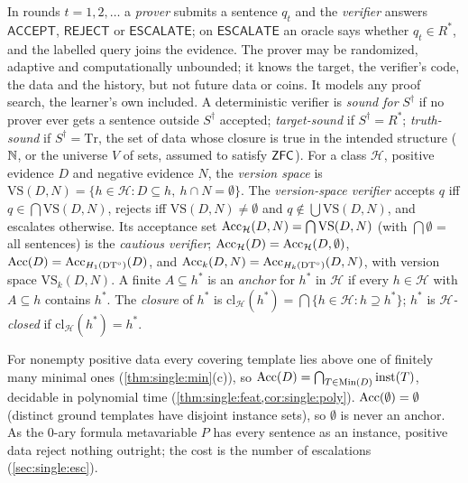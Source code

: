 \begin{definition}\label{def:setting:protocol}
In rounds $t=1,2,\dots$ a \emph{prover} submits a sentence $q_t$ and the \emph{verifier} answers $\mathsf{ACCEPT}$, $\mathsf{REJECT}$ or $\mathsf{ESCALATE}$; on $\mathsf{ESCALATE}$ an oracle says whether $q_t\in R^*$, and the labelled query joins the evidence. The prover may be randomized, adaptive and computationally unbounded; it knows the target, the verifier's code, the data and the history, but not future data or coins. It models any proof search, the learner's own included. A deterministic verifier is \emph{sound for} $S^\dagger$ if no prover ever gets a sentence outside $S^\dagger$ accepted; \emph{target-sound} if $S^\dagger=R^*$; \emph{truth-sound} if $S^\dagger=\mathrm{Tr}$, the set of data whose closure is true in the intended structure ($\mathbb{N}$, or the universe $V$ of sets, assumed to satisfy $\mathsf{ZFC}$).
For a class $\mathcal H$, positive evidence $D$ and negative evidence $N$, the \emph{version space} is $\mathrm{VS}(D,N)=\{h\in\mathcal H:D\subseteq h,\ h\cap N=\emptyset\}$. The \emph{version-space verifier} accepts $q$ iff $q\in\bigcap\mathrm{VS}(D,N)$, rejects iff $\mathrm{VS}(D,N)\neq\emptyset$ and $q\notin\bigcup\mathrm{VS}(D,N)$, and escalates otherwise. Its acceptance set $\mathrm{Acc}_{\mathcal H}(D,N)=\bigcap\mathrm{VS}(D,N)$ (with $\bigcap\emptyset$ = all sentences) is the \emph{cautious verifier}; $\mathrm{Acc}_{\mathcal H}(D)=\mathrm{Acc}_{\mathcal H}(D,\emptyset)$, $\mathrm{Acc}(D)=\mathrm{Acc}_{H_{1}(\mathrm{DT}^{\circ})}(D)$, and $\mathrm{Acc}_k(D,N)=\mathrm{Acc}_{H_{k}(\mathrm{DT}^{\circ})}(D,N)$, with version space $\mathrm{VS}_k(D,N)$.
A finite $A\subseteq h^*$ is an \emph{anchor} for $h^*$ in $\mathcal H$ if every $h\in\mathcal H$ with $A\subseteq h$ contains $h^*$. The \emph{closure} of $h^*$ is $\mathrm{cl}_{\mathcal H}(h^*)=\bigcap\{h\in\mathcal H:h\supseteq h^*\}$; $h^*$ is \emph{$\mathcal H$-closed} if $\mathrm{cl}_{\mathcal H}(h^*)=h^*$.
\end{definition}

For nonempty positive data every covering template lies above one of finitely many minimal ones (\cref{thm:single:min}(c)), so $\mathrm{Acc}(D)=\bigcap_{T\in\mathrm{Min}(D)}\mathrm{inst}(T)$, decidable in polynomial time (\cref{thm:single:feat,cor:single:poly}). $\mathrm{Acc}(\emptyset)=\emptyset$ (distinct ground templates have disjoint instance sets), so $\emptyset$ is never an anchor. As the $0$-ary formula metavariable $P$ has every sentence as an instance, positive data reject nothing outright; the cost is the number of escalations (\cref{sec:single:esc}).

